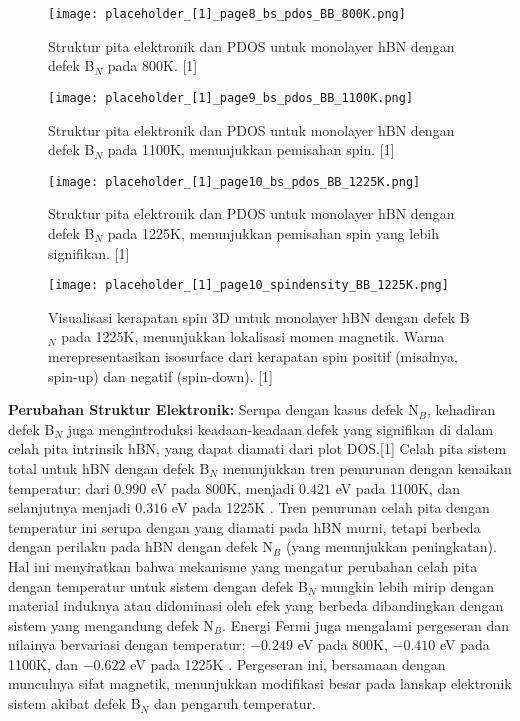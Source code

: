 \begin{figure}[h!]
    \centering
    \texttt{[image: placeholder\_[1]\_page8\_bs\_pdos\_BB\_800K.png]}
    \caption{Struktur pita elektronik dan PDOS untuk monolayer hBN dengan defek B$_N$ pada 800K. [1]}
    \label{fig:hbn_BB_800K}
\end{figure}
\begin{figure}[h!]
    \centering
    \texttt{[image: placeholder\_[1]\_page9\_bs\_pdos\_BB\_1100K.png]}
    \caption{Struktur pita elektronik dan PDOS untuk monolayer hBN dengan defek B$_N$ pada 1100K, menunjukkan pemisahan spin. [1]}
    \label{fig:hbn_BB_1100K}
\end{figure}
\begin{figure}[h!]
    \centering
    \texttt{[image: placeholder\_[1]\_page10\_bs\_pdos\_BB\_1225K.png]}
    \caption{Struktur pita elektronik dan PDOS untuk monolayer hBN dengan defek B$_N$ pada 1225K, menunjukkan pemisahan spin yang lebih signifikan. [1]}
    \label{fig:hbn_BB_1225K}
\end{figure}
\begin{figure}[h!]
    \centering
    \texttt{[image: placeholder\_[1]\_page10\_spindensity\_BB\_1225K.png]}
    \caption{Visualisasi kerapatan spin 3D untuk monolayer hBN dengan defek B$_N$ pada 1225K, menunjukkan lokalisasi momen magnetik. Warna merepresentasikan isosurface dari kerapatan spin positif (misalnya, spin-up) dan negatif (spin-down). [1]}
    \label{fig:hbn_BB_1225K_spindensity}
\end{figure}

\textbf{Perubahan Struktur Elektronik:}
Serupa dengan kasus defek N$_B$, kehadiran defek B$_N$ juga mengintroduksi keadaan-keadaan defek yang signifikan di dalam celah pita intrinsik hBN, yang dapat diamati dari plot DOS.[1] Celah pita sistem total untuk hBN dengan defek B$_N$ menunjukkan tren penurunan dengan kenaikan temperatur: dari $0.990$ eV pada 800K, menjadi $0.421$ eV pada 1100K, dan selanjutnya menjadi $0.316$ eV pada 1225K \cite{[1, 1]}. Tren penurunan celah pita dengan temperatur ini serupa dengan yang diamati pada hBN murni, tetapi berbeda dengan perilaku pada hBN dengan defek N$_B$ (yang menunjukkan peningkatan). Hal ini menyiratkan bahwa mekanisme yang mengatur perubahan celah pita dengan temperatur untuk sistem dengan defek B$_N$ mungkin lebih mirip dengan material induknya atau didominasi oleh efek yang berbeda dibandingkan dengan sistem yang mengandung defek N$_B$. Energi Fermi juga mengalami pergeseran dan nilainya bervariasi dengan temperatur: $-0.249$ eV pada 800K, $-0.410$ eV pada 1100K, dan $-0.622$ eV pada 1225K \cite{[1]}. Pergeseran ini, bersamaan dengan munculnya sifat magnetik, menunjukkan modifikasi besar pada lanskap elektronik sistem akibat defek B$_N$ dan pengaruh temperatur.

